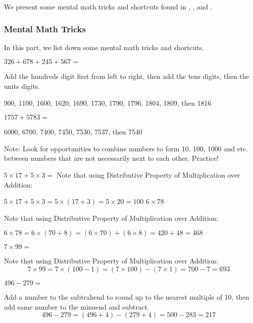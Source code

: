 We present some mental math tricks and shortcuts found in \textcite{benjamin}, \textcite{short}, and \textcite{stephens}.

\subsubsection*{Mental Math Tricks}
In this part, we list down some mental math tricks and shortcuts.



\begin{example}
\Item $326 + 678 + 245 + 567 =$

Add the hundreds digit first from left to right, then add the tens digits, then the units digits.

900, 1100, 1600, 1620, 1690, 1730, 1790, 1796, 1804, 1809, then 1816

\Item $1757 + 5783 =$

6000, 6700, 7400, 7450, 7530, 7537, then 7540

Note: Look for opportunities to combine numbers to form 10, 100, 1000 and etc. between
numbers that are not necessarily next to each other. Practice!
\end{example}

\begin{example}
\Item $5 \times 17 + 5 \times 3 =$
Note that using Distributive Property of Multiplication over Addition:

$5 \times 17 + 5 \times 3 = 5 \times (17 + 3) = 5 \times 20 = 100$
\Item $6\times 78$

Note that using Distributive Property of Multiplication over Addition:

$6 \times 78 = 6 \times (70 + 8) = (6 \times 70) + (6 \times 8) = 420 + 48 = 468$

\Item $7\times 99=$

Note that using Distributive Property of Multiplication over Addition:
\begin{equation*}
7 \times 99 = 7 \times (100 - 1) = (7 \times 100) - (7 \times 1) = 700 - 7 = 693
\end{equation*}
\end{example}


\begin{example}
\Item $496 - 279 =$

Add a number to the subtrahend to round up to the nearest multiple of 10, then add same
number to the minuend and subtract.
\begin{equation*}
496 - 279 = (496 + 4) - (279 + 4) = 500 - 283 = 217
\end{equation*}
\end{example}

